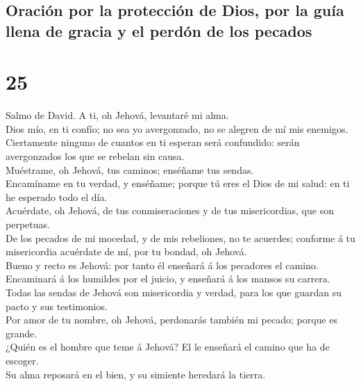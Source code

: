 \hypertarget{oraciuxf3n-por-la-protecciuxf3n-de-dios-por-la-guuxeda-llena-de-gracia-y-el-perduxf3n-de-los-pecados}{%
\subsection{Oración por la protección de Dios, por la guía llena de
gracia y el perdón de los
pecados}\label{oraciuxf3n-por-la-protecciuxf3n-de-dios-por-la-guuxeda-llena-de-gracia-y-el-perduxf3n-de-los-pecados}}

\hypertarget{section-24}{%
\section{25}\label{section-24}}

 Salmo de David. A ti, oh Jehová, levantaré mi alma.\\
 Dios mío, en ti confío; no sea yo avergonzado, no se
alegren de mí mis enemigos.\\
 Ciertamente ninguno de cuantos en ti esperan será
confundido: serán avergonzados los que se rebelan sin causa.\\
 Muéstrame, oh Jehová, tus caminos; enséñame tus sendas.\\
 Encamíname en tu verdad, y enséñame; porque tú eres el
Dios de mi salud: en ti he esperado todo el día.\\
 Acuérdate, oh Jehová, de tus conmiseraciones y de tus
misericordias, que son perpetuas.\\
 De los pecados de mi mocedad, y de mis rebeliones, no te
acuerdes; conforme á tu misericordia acuérdate de mí, por tu bondad, oh
Jehová.\\
 Bueno y recto es Jehová: por tanto él enseñará á los
pecadores el camino.\\
 Encaminará á los humildes por el juicio, y enseñará á los
mansos su carrera.\\
 Todas las sendas de Jehová son misericordia y verdad,
para los que guardan su pacto y sus testimonios.\\
 Por amor de tu nombre, oh Jehová, perdonarás también mi
pecado; porque es grande.\\
 ¿Quién es el hombre que teme á Jehová? El le enseñará el
camino que ha de escoger.\\
 Su alma reposará en el bien, y su simiente heredará la
tierra.\\
